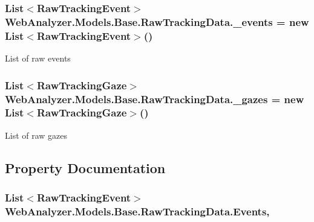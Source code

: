 \subsubsection[{\+\_\+events}]{\setlength{\rightskip}{0pt plus 5cm}List$<${\bf Raw\+Tracking\+Event}$>$ Web\+Analyzer.\+Models.\+Base.\+Raw\+Tracking\+Data.\+\_\+events = new List$<${\bf Raw\+Tracking\+Event}$>$()\hspace{0.3cm}{\ttfamily [private]}}\label{class_web_analyzer_1_1_models_1_1_base_1_1_raw_tracking_data_ab00b8549401b2116e14913d21c271322}


List of raw events 

\hypertarget{class_web_analyzer_1_1_models_1_1_base_1_1_raw_tracking_data_a74e9bb3eb14735e880cb53a28483538a}{}
\subsubsection[{\+\_\+gazes}]{\setlength{\rightskip}{0pt plus 5cm}List$<${\bf Raw\+Tracking\+Gaze}$>$ Web\+Analyzer.\+Models.\+Base.\+Raw\+Tracking\+Data.\+\_\+gazes = new List$<${\bf Raw\+Tracking\+Gaze}$>$()\hspace{0.3cm}{\ttfamily [private]}}\label{class_web_analyzer_1_1_models_1_1_base_1_1_raw_tracking_data_a74e9bb3eb14735e880cb53a28483538a}


List of raw gazes 



\subsection{Property Documentation}
\hypertarget{class_web_analyzer_1_1_models_1_1_base_1_1_raw_tracking_data_a288234f675cdfe067ec0667aa2be36c3}{}
\subsubsection[{Events}]{\setlength{\rightskip}{0pt plus 5cm}List$<${\bf Raw\+Tracking\+Event}$>$ Web\+Analyzer.\+Models.\+Base.\+Raw\+Tracking\+Data.\+Events\hspace{0.3cm}{\ttfamily [get]}, {\ttfamily [set]}}\label{class_web_analyzer_1_1_models_1_1_base_1_1_raw_tracking_data_a288234f675cdfe067ec0667aa2be36c3}


